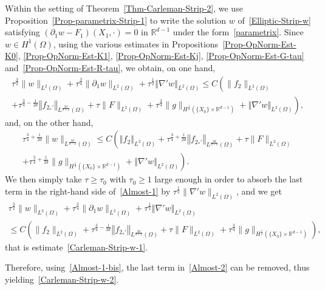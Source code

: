 \documentclass[10pt]{amsart}
\theoremstyle{definition}\newtheorem{defi}[theo]{Definition}\newtheorem{rema}[theo]{Remark}\newtheorem{exam}[theo]{Example}\newtheorem{exem}[theo]{Example}\newtheorem{nota}[theo]{Notation}
\newcommand*\R{\mathbb{R}}
\newcommand{\norm}[1]{\left\Vert#1\right\Vert}
\renewcommand{\leq}{\leqslant}
\renewcommand{\geq}{\geqslant}
\begin{document}
Within the setting of Theorem~\ref{Thm-Carleman-Strip-2}, we use Proposition~\ref{Prop-parametrix-Strip-1} to write the solution $w$ of~\eqref{Elliptic-Strip-w} satisfying $(\partial_1 w -F_1)(X_1,\cdot) = 0$ in $\R^{d-1}$ under the form~\eqref{parametrix}. Since $w \in H^1(\Omega)$, using the various estimates in Propositions~\ref{Prop-OpNorm-Est-K0}, \ref{Prop-OpNorm-Est-K1}, \ref{Prop-OpNorm-Est-Kj}, \ref{Prop-OpNorm-Est-G-tau} and~\ref{Prop-OpNorm-Est-R-tau}, we obtain, on one hand,
\begin{multline}\label{Almost-1}
\tau^{\frac{3}{2}} \| w\|_{L^2(\Omega)} +
\tau^{\frac{3}{4}} \| \partial_1 w\|_{L^2(\Omega)} +
\tau^{\frac{1}{2}} \norm{\nabla' w}_{L^2(\Omega)}
\leq C\left(
\| f_2 \|_{L^2(\Omega)}
\right.
\\
\left. +
\tau^{\frac{3}{4}- \frac{1}{2d}} \norm{f_{2_*'}}_{L^{\frac{2d}{d+2}}(\Omega)} +
\tau \| F \|_{L^2(\Omega)}+
\tau^{\frac{3}{4}} \| g \|_{H^{\frac{1}{2}}
\left(\{X_0\} \times \R^{d-1}\right)} +
\norm{\nabla' w}_{L^2(\Omega)}
\right),
\end{multline}
and, on the other hand,
\begin{multline}\label{Almost-2}
\tau^{\frac{3}{4}+\frac{1}{2d}} \| w\|_{L^{\frac{2d}{d-2}}(\Omega)}
\leq C\left(
\norm{f_2}_{L^2(\Omega)} +
\tau^{\frac{3}{4}+\frac{1}{2d}} \norm{f_{2_*'}}_{L^{\frac{2d}{d+2}}(\Omega)} +
\tau \| F \|_{L^2(\Omega)}
\right.
\\
\left.+
\tau^{\frac{3}{4}+ \frac{1}{2d}} \| g \|_{H^{\frac{1}{2}}\left(\{X_0\} \times \R^{d-1}\right)} +
\norm{\nabla' w}_{L^2(\Omega)}
\right).
\end{multline}
We then simply take $\tau \geq \tau_0$ with $\tau_0 \geq 1$ large enough in order to absorb the last term in the right-hand side of~\eqref{Almost-1} by $\tau^{\frac{1}{2}} \|\nabla' w\|_{L^2(\Omega)}$, and we get
\begin{multline}\label{Almost-1-bis}
\tau^{\frac{3}{2}} \| w\|_{L^2(\Omega)} +
\tau^{\frac{3}{4}} \| \partial_1 w\|_{L^2(\Omega)} +
\tau^{\frac{1}{2}} \norm{\nabla' w}_{L^2(\Omega)}
\\
\leq C\left(
\| f_2 \|_{L^2(\Omega)} +
\tau^{\frac{3}{4}- \frac{1}{2d}} \norm{f_{2_*'}}_{L^{\frac{2d}{d+2}}(\Omega)} +
\tau \| F \|_{L^2(\Omega)} +
\tau^{\frac{3}{4}} \| g \|_{H^{\frac{1}{2}}
\left(\{X_0\} \times \R^{d-1}\right)}
\right),
\end{multline}
that is estimate~\eqref{Carleman-Strip-w-1}.

Therefore, using~\eqref{Almost-1-bis}, the last term in~\eqref{Almost-2} can be removed, thus yielding~\eqref{Carleman-Strip-w-2}.
\end{document}
